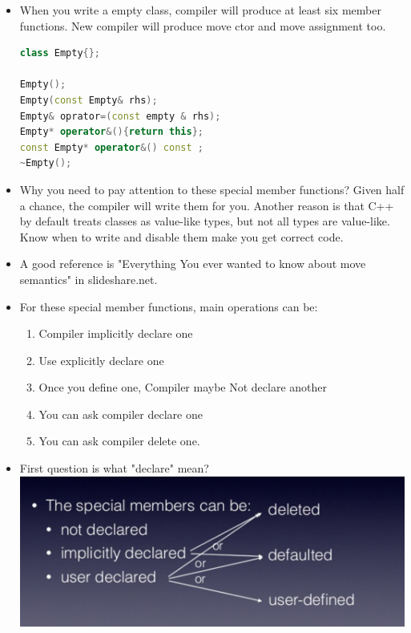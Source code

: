 \documentclass[a4paper,12pt,twoside]{book}
\begin{document}
\begin{itemize}

\item When you write a empty class, compiler will produce at least six member functions.  New compiler will produce move ctor and move assignment too.
\begin{lstlisting}[frame=single, language=c++]
class Empty{};

Empty();
Empty(const Empty& rhs);
Empty& oprator=(const empty & rhs);
Empty* operator&(){return this};
const Empty* operator&() const ;
~Empty();
\end{lstlisting}

\item Why you need to pay attention to these special member functions?  Given half a chance, the compiler will write them for you. Another reason is that C++ by default treats classes as value-like types, but not all types are value-like. Know when to write and disable them make you get correct code.

\item A good reference is "Everything You ever wanted to know about move semantics" in slideshare.net.

\item For these special member functions, main operations can be:
\begin{enumerate}
\item Compiler implicitly declare one
\item Use explicitly declare one
\item Once you define one, Compiler maybe Not declare another
\item You can ask compiler declare one
\item You can ask compiler delete one.
\end{enumerate}

\item First question is what "declare" mean?  \\
\includegraphics[scale=0.6]{pics/sm1.png} \newline


\end{itemize}
\end{document}
